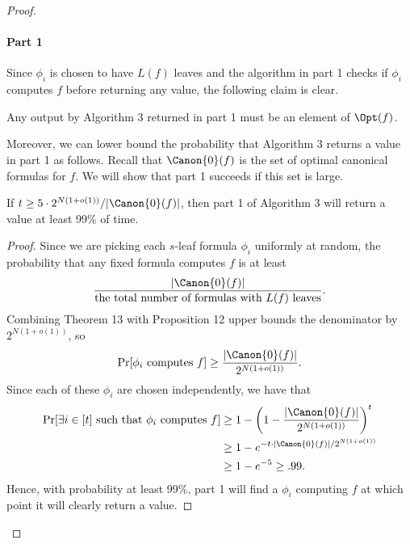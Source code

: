 \begin{proof}
\paragraph{Part 1}
Since $\phi_i$ is chosen to have $L(f)$ leaves and the algorithm in part 1 checks if $\phi_i$ computes $f$ before returning any value, the following claim is clear.
\begin{ntclaim}
Any output by Algorithm 3 returned in part 1 must be an element of $\Opt(f)$.
\end{ntclaim}
Moreover, we can lower bound the probability that Algorithm 3 returns a value in part 1 as follows. Recall that $\Canon{0}(f)$ is the set of optimal canonical formulas for $f$. We will show that part 1 succeeds if this set is large.
\begin{ntclaim}
If $t\geq 5\cdot 2^{N(1+o(1))}/|\Canon{0}(f)|$, then part 1 of Algorithm 3 will return a value at least 99\% of time.
\end{ntclaim}
\begin{proof}
Since we are picking each $s$-leaf formula $\phi_i$ uniformly at random, the probability that any fixed formula computes $f$ is at least
\[\frac{|\Canon{0}(f)|}{\text{the total number of formulas with }L(f)\text{ leaves}}.\]
Combining Theorem 13 with Proposition 12 upper bounds the denominator by $2^{N(1+o(1))}$, so
\[\Pr[\phi_i\text{ computes }f]\geq\frac{|\Canon{0}(f)|}{2^{N(1+o(1))}}.\]
Since each of these $\phi_i$ are chosen independently, we have that
\begin{align*}\Pr[\exists i\in[t]\text{ such that }\phi_i\text{ computes }f]&\geq 1-\left(1-\frac{|\Canon{0}(f)|}{2^{N(1+o(1))}}\right)^t\\&\geq 1-e^{-t\cdot|\Canon{0}(f)|/2^{N(1+o(1))}}\\&\geq 1-e^{-5}\geq.99.\end{align*}
Hence, with probability at least 99\%, part 1 will find a $\phi_i$ computing $f$ at which point it will clearly return a value.
\end{proof}

\end{proof}
